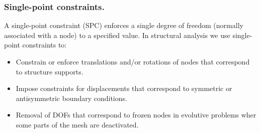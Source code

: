 \subsubsection{Single-point constraints.} \label{sc_sp_constraints}
A single-point constraint (SPC) enforces a single degree of freedom (normally associated with a node) to a specified value. In structural analysis we use single-point constraints to:

\begin{itemize}
  \item Constrain or enforce translations and/or rotations of nodes that correspond to structure supports.
  \item Impose constraints for displacements that correspond to symmetric or antisymmetric boundary conditions.
  \item Removal of DOFs that correspond to frozen nodes in evolutive problems wher some parts of the mesh are deactivated.
\end{itemize}
